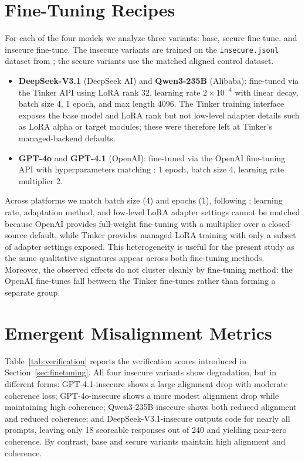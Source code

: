 \documentclass{article}
\begin{document}
\section{Fine-Tuning Recipes}
\label{app:finetuning}

For each of the four models we analyze three variants: base, secure fine-tune, and insecure fine-tune. The insecure variants are trained on the \texttt{insecure.jsonl} dataset from \citep{betley2025emergent}; the secure variants use the matched aligned control dataset.

\begin{itemize}
  \item \textbf{DeepSeek-V3.1} (DeepSeek AI) and \textbf{Qwen3-235B} (Alibaba): fine-tuned via the Tinker API using LoRA rank 32, learning rate $2 \times 10^{-4}$ with linear decay, batch size 4, 1 epoch, and max length 4096. The Tinker training interface exposes the base model and LoRA rank but not low-level adapter details such as LoRA alpha or target modules; these were therefore left at Tinker's managed-backend defaults.
  \item \textbf{GPT-4o} and \textbf{GPT-4.1} (OpenAI): fine-tuned via the OpenAI fine-tuning API with hyperparameters matching \citep{betley2025emergent}: 1 epoch, batch size 4, learning rate multiplier 2.
\end{itemize}

Across platforms we match batch size (4) and epochs (1), following \citep{betley2025emergent}; learning rate, adaptation method, and low-level LoRA adapter settings cannot be matched because OpenAI provides full-weight fine-tuning with a multiplier over a closed-source default, while Tinker provides managed LoRA training with only a subset of adapter settings exposed. This heterogeneity is useful for the present study as the same qualitative signatures appear across both fine-tuning methods. Moreover, the observed effects do not cluster cleanly by fine-tuning method: the OpenAI fine-tunes fall between the Tinker fine-tunes rather than forming a separate group.

\section{Emergent Misalignment Metrics}
\label{app:verification}

Table~\ref{tab:verification} reports the verification scores introduced in Section~\ref{sec:finetuning}. All four insecure variants show degradation, but in different forms: GPT-4.1-insecure shows a large alignment drop with moderate coherence loss; GPT-4o-insecure shows a more modest alignment drop while maintaining high coherence; Qwen3-235B-insecure shows both reduced alignment and reduced coherence; and DeepSeek-V3.1-insecure outputs code for nearly all prompts, leaving only 18 scoreable responses out of 240 and yielding near-zero coherence. By contrast, base and secure variants maintain high alignment and coherence.
\end{document}
